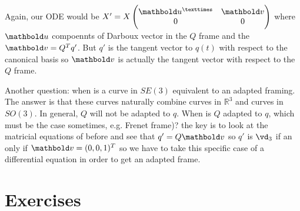 \documentclass[palatino]{epflnotes}
\begin{document}
Again, our ODE would be $X' = X\begin{pmatrix}\vu^× & \vv \\ 0 & 0 \end{pmatrix}$ where $\vu$ compoennts of Darboux vector in the $Q$ frame and the $\vv = \trans{Q}q'$. But $q'$ is the tangent vector to $q(t)$ with respect to the canonical basis so $\vv$ is actually the tangent vector with respect to the $Q$ frame.

Another question: when is a curve in $SE(3)$ equivalent to an adapted framing. The answer is that these curves naturally combine curves in $ℝ^3$ and curves in $SO(3)$. In general, $Q$ will not be adapted to $q$. When is $Q$ adapted to $q$, which must be the case sometimes, e.g. Frenet frame)? the key is to look at the matricial equations of before and see that $q' = Q\vv$ so $q'$ is $\vd_3$ if an only if $\vv = (0,0,1)^T$ so we have to take this specific case of a differential equation in order to get an adapted frame.

\appendix
\chapter{Exercises}


\backmatter
\printindex
\end{document}
